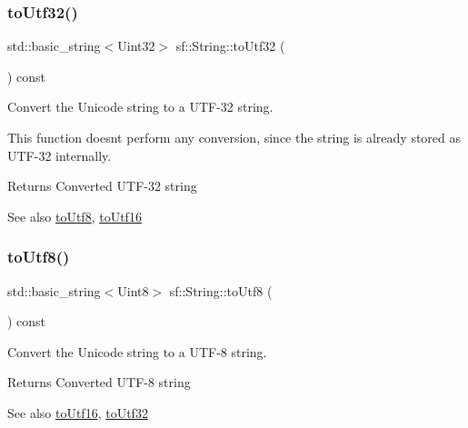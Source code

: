 \subsubsection{\texorpdfstring{toUtf32()}{toUtf32()}}
{\footnotesize\ttfamily std\+::basic\+\_\+string$<$Uint32$>$ sf\+::\+String\+::to\+Utf32 (\begin{DoxyParamCaption}{ }\end{DoxyParamCaption}) const}



Convert the Unicode string to a U\+T\+F-\/32 string. 

This function doesn\textquotesingle{}t perform any conversion, since the string is already stored as U\+T\+F-\/32 internally.

\begin{DoxyReturn}{Returns}
Converted U\+T\+F-\/32 string
\end{DoxyReturn}
\begin{DoxySeeAlso}{See also}
\mbox{\hyperlink{classsf_1_1_string_a9e12e9c568994e6df06962cf49180699}{to\+Utf8}}, \mbox{\hyperlink{classsf_1_1_string_a476374646d92143c0efcae8ac1fbe4ce}{to\+Utf16}} \begin{DoxyVerb}\end{DoxyVerb}
 
\end{DoxySeeAlso}
\mbox{\label{classsf_1_1_string_a9e12e9c568994e6df06962cf49180699}} 
\subsubsection{\texorpdfstring{toUtf8()}{toUtf8()}}
{\footnotesize\ttfamily std\+::basic\+\_\+string$<$Uint8$>$ sf\+::\+String\+::to\+Utf8 (\begin{DoxyParamCaption}{ }\end{DoxyParamCaption}) const}



Convert the Unicode string to a U\+T\+F-\/8 string. 

\begin{DoxyReturn}{Returns}
Converted U\+T\+F-\/8 string
\end{DoxyReturn}
\begin{DoxySeeAlso}{See also}
\mbox{\hyperlink{classsf_1_1_string_a476374646d92143c0efcae8ac1fbe4ce}{to\+Utf16}}, \mbox{\hyperlink{classsf_1_1_string_af1f2a3c069ce9e53fe901065cff41f68}{to\+Utf32}} \begin{DoxyVerb}\end{DoxyVerb}
 
\end{DoxySeeAlso}
\mbox{\label{classsf_1_1_string_a9d81aa3103e7e2062bd85d912a5aecf1}} 
